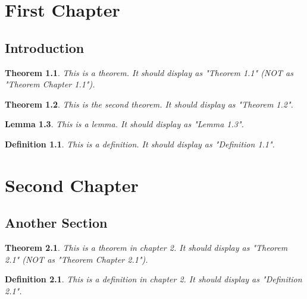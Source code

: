 \documentclass{jbook}
\newtheorem{theorem}{Theorem}[chapter]
\newtheorem{lemma}[theorem]{Lemma}  %
\newtheorem{definition}{Definition}[chapter]  %
\begin{document}
\chapter{First Chapter}

\section{Introduction}

\begin{theorem}
This is a theorem. It should display as "Theorem 1.1"
(NOT as "Theorem Chapter 1.1").
\end{theorem}

\begin{theorem}
This is the second theorem. It should display as "Theorem 1.2".
\end{theorem}

\begin{lemma}
This is a lemma. It should display as "Lemma 1.3".
\end{lemma}

\begin{definition}
This is a definition. It should display as "Definition 1.1".
\end{definition}

\chapter{Second Chapter}

\section{Another Section}

\begin{theorem}
This is a theorem in chapter 2. It should display as "Theorem 2.1"
(NOT as "Theorem Chapter 2.1").
\end{theorem}

\begin{definition}
This is a definition in chapter 2. It should display as "Definition 2.1".
\end{definition}
\end{document}
